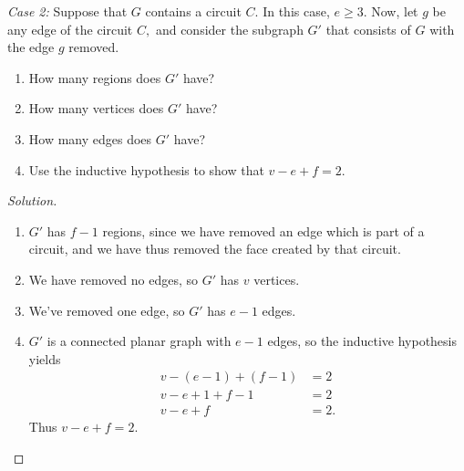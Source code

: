 \documentclass[12pt]{article}
\newenvironment{exercise}[2][Exercise]{\begin{trivlist}
        \item[\hskip \labelsep {\bfseries #1}\hskip \labelsep {\bfseries #2.}]}{\end{trivlist}}
\newenvironment{solution}
        {\begin{proof}[Solution]}
                    {\end{proof}}
\begin{document}
\begin{exercise}{56}
    \textit{Case 2:} Suppose that \( G \) contains a circuit \( C. \) In this case, \( e \geq 3. \) Now, let \( g \) be any edge of the circuit \( C, \) and consider the subgraph \( G' \) that consists of \( G \) with the edge \( g \) removed.
    \begin{enumerate}[label=(\alph*)]
        \item How many regions does \( G' \) have?
        \item How many vertices does \( G' \) have?
        \item How many edges does \( G' \) have?
        \item Use the inductive hypothesis to show that \( v-e+f=2. \)
    \end{enumerate}
    \begin{solution}
        \begin{enumerate}[label=(\alph*)]
            \item \( G' \) has \( f-1 \) regions, since we have removed an edge which is part of a circuit, and we have thus removed the face created by that circuit.
            \item We have removed no edges, so \( G' \) has \( v \) vertices.
            \item We've removed one edge, so \( G' \) has \( e-1 \) edges.
            \item \( G' \) is a connected planar graph with \( e-1 \) edges, so the inductive hypothesis yields
                \begin{align*}
                    v - (e-1) + (f-1) &= 2\\
                    v - e + 1 + f - 1 &= 2\\
                    v - e + f &= 2.
                \end{align*}
                Thus \( v-e+f = 2. \)
        \end{enumerate}
    \end{solution}
\end{exercise}
\end{document}
